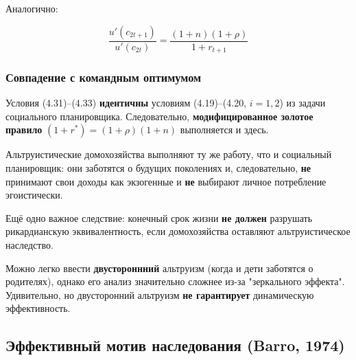 \documentclass[10pt,a4paper]{article}
\begin{document}
Аналогично:
\begin{formulabox}
\begin{equation}
\frac{u'(c_{2t+1})}{u'(c_{2t})} = \frac{(1+n)(1+\rho)}{1+r_{t+1}} \tag{4.33}
\end{equation}
\end{formulabox}

\subsubsection{Совпадение с командным оптимумом}

Условия (4.31)--(4.33) \textbf{идентичны} условиям (4.19)--(4.20, $i=1,2$) из задачи социального планировщика. Следовательно, \textbf{модифицированное золотое правило} $(1+r^{*}) = (1+\rho)(1+n)$ выполняется и здесь.

\begin{intuition}
Альтруистические домохозяйства выполняют ту же работу, что и социальный планировщик: они заботятся о будущих поколениях и, следовательно, \textbf{не} принимают свои доходы как экзогенные и \textbf{не} выбирают личное потребление эгоистически.

Ещё одно важное следствие: конечный срок жизни \textbf{не должен} разрушать рикардианскую эквивалентность, если домохозяйства оставляют альтруистическое наследство.

Можно легко ввести \textbf{двустороннний} альтруизм (когда и дети заботятся о родителях), однако его анализ значительно сложнее из-за "зеркального эффекта". Удивительно, но двусторонний альтруизм \textbf{не гарантирует} динамическую эффективность.
\end{intuition}

\subsection{Эффективный мотив наследования (Barro, 1974)}
\end{document}
